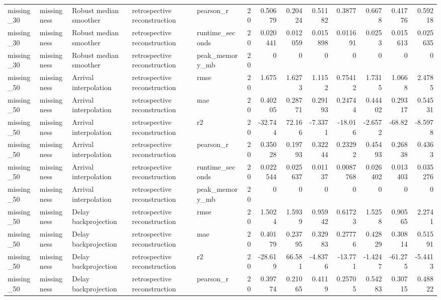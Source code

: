 \begin{table}[!htbp]
{{\begin{tabular}{lllllrrrrrrrr}
missing_30 & missingness & Robust median smoother & retrospective reconstruction & pearson_r & 20 & 0.50679 & 0.20424 & 0.51182 & 0.3877 & 0.6678 & 0.41776 & 0.59218 \\
missing_30 & missingness & Robust median smoother & retrospective reconstruction & runtime_seconds & 20 & 0.020441 & 0.012059 & 0.015898 & 0.011691 & 0.0253 & 0.015613 & 0.025635 \\
missing_30 & missingness & Robust median smoother & retrospective reconstruction & peak_memory_mb & 20 & 0 & 0 & 0 & 0 & 0 & 0 & 0 \\
missing_50 & missingness & Arrival interpolation & retrospective reconstruction & rmse & 20 & 1.675 & 1.6273 & 1.1152 & 0.75412 & 1.7315 & 1.0668 & 2.4785 \\
missing_50 & missingness & Arrival interpolation & retrospective reconstruction & mae & 20 & 0.40205 & 0.28771 & 0.29193 & 0.24744 & 0.44402 & 0.29317 & 0.54531 \\
missing_50 & missingness & Arrival interpolation & retrospective reconstruction & r2 & 20 & -32.744 & 72.166 & -7.3371 & -18.016 & -2.6572 & -68.82 & -8.5978 \\
missing_50 & missingness & Arrival interpolation & retrospective reconstruction & pearson_r & 20 & 0.35028 & 0.19793 & 0.32244 & 0.23292 & 0.45493 & 0.26838 & 0.4363 \\
missing_50 & missingness & Arrival interpolation & retrospective reconstruction & runtime_seconds & 20 & 0.022544 & 0.025637 & 0.01137 & 0.0087768 & 0.026402 & 0.013403 & 0.035276 \\
missing_50 & missingness & Arrival interpolation & retrospective reconstruction & peak_memory_mb & 20 & 0 & 0 & 0 & 0 & 0 & 0 & 0 \\
missing_50 & missingness & Delay backprojection & retrospective reconstruction & rmse & 20 & 1.5024 & 1.5939 & 0.95942 & 0.61723 & 1.5258 & 0.90565 & 2.2741 \\
missing_50 & missingness & Delay backprojection & retrospective reconstruction & mae & 20 & 0.40179 & 0.23795 & 0.32983 & 0.27776 & 0.42829 & 0.30814 & 0.51591 \\
missing_50 & missingness & Delay backprojection & retrospective reconstruction & r2 & 20 & -28.619 & 66.581 & -4.8376 & -13.771 & -1.4247 & -61.275 & -5.4413 \\
missing_50 & missingness & Delay backprojection & retrospective reconstruction & pearson_r & 20 & 0.39774 & 0.21065 & 0.4119 & 0.25705 & 0.54283 & 0.30715 & 0.48822 \\

\end{tabular}}}
\end{table}
